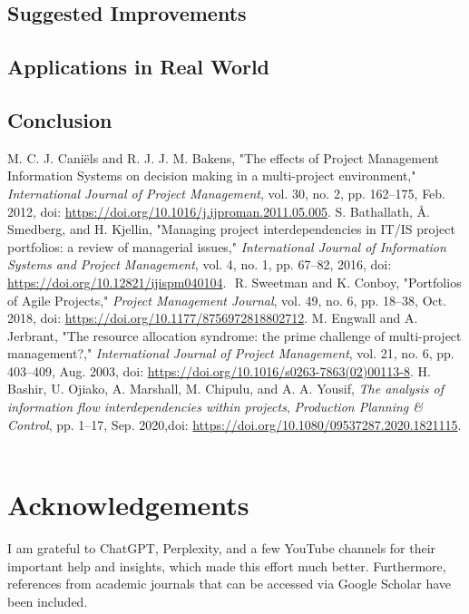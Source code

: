 \documentclass{llncs}
\begin{document}
\subsection{Suggested Improvements}

\subsection{Applications in Real World}

\subsection{Conclusion}



\begin{thebibliography}{5}
  M. C. J. Caniëls and R. J. J. M. Bakens, "The effects of Project Management Information Systems on decision making in a multi-project environment," \textit{International Journal of Project Management}, vol. 30, no. 2, pp. 162–175, Feb. 2012, doi: \url{https://doi.org/10.1016/j.ijproman.2011.05.005}.
  S. Bathallath, Å. Smedberg, and H. Kjellin, "Managing project interdependencies in IT/IS project portfolios: a review of managerial issues," \textit{International Journal of Information Systems and Project Management}, vol. 4, no. 1, pp. 67–82, 2016, doi: \url{https://doi.org/10.12821/ijispm040104}.
‌
  R. Sweetman and K. Conboy, "Portfolios of Agile Projects," \textit{Project Management Journal}, vol. 49, no. 6, pp. 18–38, Oct. 2018, doi: \url{https://doi.org/10.1177/8756972818802712}.
 M. Engwall and A. Jerbrant, "The resource allocation syndrome: the prime challenge of multi-project management?," \textit{International Journal of Project Management}, vol. 21, no. 6, pp. 403–409, Aug. 2003, doi: \url{https://doi.org/10.1016/s0263-7863(02)00113-8}.
H. Bashir, U. Ojiako, A. Marshall, M. Chipulu, and A. A. Yousif,
\textit{The analysis of information flow interdependencies within projects},
\textit{Production Planning \& Control}, pp. 1–17, Sep. 2020,doi: \url{https://doi.org/10.1080/09537287.2020.1821115}.
‌
\end{thebibliography}



\section{Acknowledgements}
I am grateful to ChatGPT, Perplexity, and a few YouTube channels for their important help and insights, which made this effort much better. Furthermore, references from academic journals that can be accessed via Google Scholar have been included.
\end{document}
